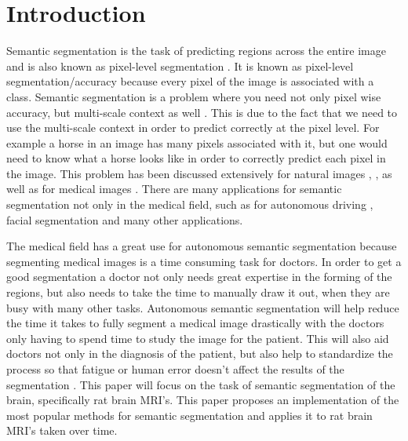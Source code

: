 \chapter{Introduction}
Semantic segmentation is the task of predicting regions across the entire image and is also known as pixel-level segmentation \cite{DBLP:journals/corr/abs-1809-10198semanticprogress}. 
It is known as pixel-level segmentation/accuracy because every pixel of the image is associated with a class. 
Semantic segmentation is a problem where you need not only pixel wise accuracy, but multi-scale context as well \cite{Yu2016MultiScaleCA}. 
This is due to the fact that we need to use the multi-scale context in order to predict correctly at the pixel level. 
For example a horse in an image has many pixels associated with it, but one would need to know what a horse looks like in order to correctly predict each pixel in the image. 
This problem has been discussed extensively for natural images \cite{DBLP:journals/corr/LongSD14}, \cite{DBLP:journals/corr/ChenPSA17}, \cite{Yu2016MultiScaleCA} as well as for medical images \cite{DBLP:journals/corr/RonnebergerFB15}. 
There are many applications for semantic segmentation not only in the medical field, such as for autonomous driving \cite{inbookautomous}, facial segmentation \cite{7350915face} and many other applications. 

The medical field has a great use for autonomous semantic segmentation because segmenting medical images is a time consuming task for doctors.
In order to get a good segmentation a doctor not only needs great expertise in the forming of the regions, but also needs to take the time to manually draw it out, when they are busy with many other tasks.  
Autonomous semantic segmentation will help reduce the time it takes to fully segment a medical image drastically with the doctors only having to spend time to study the image for the patient.
This will also aid doctors not only in the diagnosis of the patient, but also help to standardize the process so that fatigue or human error doesn't affect the results of the segmentation \cite{SharmaAutomatedImageSegmentationTech}. 
This paper will focus on the task of semantic segmentation of the brain, specifically rat brain MRI's.
This paper proposes an implementation of the most popular methods for semantic segmentation and applies it to rat brain MRI's taken over time. 


